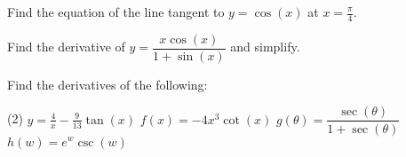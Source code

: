 \documentclass[mathNotesPreamble]{subfiles}
\begin{document}
\begin{ex*}
  Find the equation of the line tangent to $y=\cos(x)$ at $x=\frac{\pi}{4}$.
\end{ex*}
\begin{ex*}
  Find the derivative of $y=\dfrac{x\cos(x)}{1+\sin(x)}$ and simplify.
\end{ex*}
\pagebreak

\begin{center}
\end{center}
\begin{ex*}
  Find the derivatives of the following:
\end{ex*}
\begin{tasks}[after-item-skip=\stretch{1}](2)
  \task[] $y=\frac{4}{x}-\frac{9}{13}\tan(x)$
  \task[] $f(x)=-4x^3\cot(x)$
  \task[] $g(\theta)=\dfrac{\sec(\theta)}{1+\sec(\theta)}$
  \task[] $h(w)=e^w\csc(w)$
\end{tasks}
\pagebreak
\end{document}
